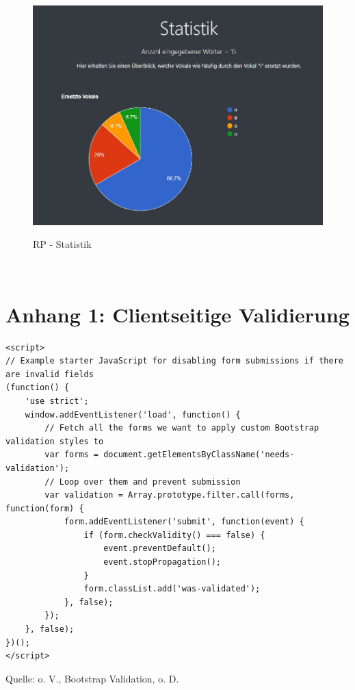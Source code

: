 \documentclass[a4paper,
12pt,
oneside]
{article}
\begin{document}
	\begin{figure}[h]
		\centering
		\caption{RP - Statistik}
		\includegraphics[width=1\textwidth]{img/statistik.jpg} \\
		\label{fig:statistic}
	\end{figure} \\
	\clearpage
	
	
	
	
	
	\section*{Anhang 1: Clientseitige Validierung}
	\begin{lstlisting}
<script>
// Example starter JavaScript for disabling form submissions if there are invalid fields
(function() {
	'use strict';
	window.addEventListener('load', function() {
		// Fetch all the forms we want to apply custom Bootstrap validation styles to
		var forms = document.getElementsByClassName('needs-validation');
		// Loop over them and prevent submission
		var validation = Array.prototype.filter.call(forms, function(form) {
			form.addEventListener('submit', function(event) {
				if (form.checkValidity() === false) {
					event.preventDefault();
					event.stopPropagation();
				}
				form.classList.add('was-validated');
			}, false);
		});
	}, false);
})();
</script>
	\end{lstlisting}
	{\centering\footnotesize Quelle: o. V., Bootstrap Validation, o. D.\par}
	\clearpage
	
\end{document}
